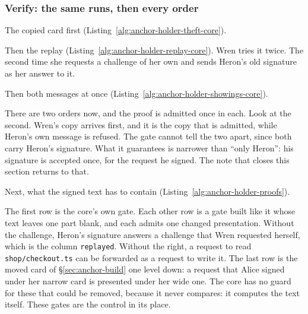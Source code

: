 \subsubsection{Verify: the same runs, then every order}

The copied card first (Listing~\ref{alg:anchor-holder-theft-core}).


Then the replay (Listing~\ref{alg:anchor-holder-replay-core}). Wren
tries it twice. The second time she requests a challenge of her own and
sends Heron's old signature as her answer to it.


Then both messages at once (Listing~\ref{alg:anchor-holder-showings-core}).


There are two orders now, and the proof is admitted once in each. Look
at the second. Wren's copy arrives first, and it is the copy that is
admitted, while Heron's own message is refused. The gate cannot tell the
two apart, since both carry Heron's signature. What it guarantees is
narrower than ``only Heron'': his signature is accepted once, for the
request he signed. The note that closes this section returns to that.

Next, what the signed text has to contain
(Listing~\ref{alg:anchor-holder-proofs}).


The first row is the core's own gate. Each other row is a gate built like
it whose text leaves one part blank, and each admits one changed
presentation. Without the challenge, Heron's signature answers a challenge
that Wren requested herself, which is the column \texttt{replayed}. Without
the right, a request to read \texttt{shop/checkout.ts} can be forwarded as a
request to write it. The last row is the moved card of
\S\ref{sec:anchor-build} one level down: a request that Alice signed under
her narrow card is presented under her wide one. The core has no guard for
these that could be removed, because it never compares: it computes the
text itself. These gates are the control in its place.

